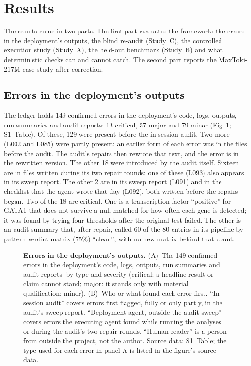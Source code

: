 \section*{Results}

The results come in two parts. The first part evaluates the framework:
the errors in the deployment's outputs, the blind re-audit (Study~C), the
controlled execution study (Study~A), the held-out benchmark (Study~B)
and what deterministic checks can and cannot catch. The second part
reports the MaxToki-217M case study after correction.

\subsection*{Errors in the deployment's outputs}
The ledger holds 149 confirmed errors in the deployment's code, logs,
outputs, run summaries and audit reports: 13 critical, 57 major and 79
minor (Fig~\ref{fig:ledger}; S1~Table). Of these, 129 were present before
the in-session audit. Two more (L002 and L085) were partly present: an earlier form of each error was in the files before the audit. The audit's repairs then rewrote that
text, and the error is in the rewritten version. The other 18 were introduced
by the audit itself. Sixteen are in files written during its two repair rounds;
one of these (L093) also appears in its sweep report. The other 2 are in
its sweep report (L091) and in the checklist that the agent wrote that
day (L092), both written before the repairs began. Two of the 18 are
critical. One is a transcription-factor ``positive'' for GATA1 that does
not survive a null matched for how often each gene is detected; it was
found by trying four thresholds after the original test failed. The
other is an audit summary that, after repair, called 60 of the 80
entries in its pipeline-by-pattern verdict matrix (75\%) ``clean'', with
no new matrix behind that count.

\begin{figure}[H]
\caption{\textbf{Errors in the deployment's outputs.} (A)~The 149
confirmed errors in the deployment's code, logs, outputs, run summaries
and audit reports, by type and severity (critical: a headline result or
claim cannot stand; major: it stands only with material qualification;
minor). (B)~Who or what found each error first. ``In-session audit''
covers errors first flagged, fully or only partly, in the audit's sweep
report. ``Deployment agent, outside the audit sweep'' covers errors the
executing agent found while running the analyses or during the audit's
two repair rounds. ``Human reader'' is a person from outside the
project, not the author.
Source data: S1~Table; the type used for each error in panel A is listed
in the figure's source data.}
\label{fig:ledger}
\end{figure}

